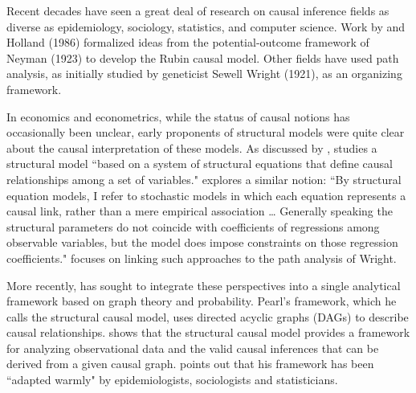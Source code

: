 \documentclass[11pt]{amsart}
\begin{document}

Recent decades have seen a great deal of research on causal inference fields as diverse as epidemiology, sociology, statistics, and computer science. 
Work by \cite{Rubin:1974im,Rubin:1977dv} and Holland (1986) formalized ideas from the potential-outcome framework of Neyman (1923) to develop the Rubin causal model. %
Other fields have used path analysis, as initially studied by geneticist Sewell Wright (1921), as an organizing framework.

In economics and econometrics, while the status of causal notions has occasionally been unclear, early proponents of structural models were quite clear about the causal interpretation of these models.
As discussed by \citep{Heckman:2015ez}, \citep{Haavelmo:1943cl,Haavelmo:1944jq} studies a structural model ``based on a system of structural equations that define causal relationships among a set of variables."
\citep[p.979]{Goldberger:1972cq} explores a similar notion: ``By structural equation models, I refer to stochastic models in which each equation represents a causal link, rather than a mere empirical association \dots
Generally speaking the structural parameters do not coincide with coefficients of regressions among observable variables, but the model does impose constraints on those regression coefficients."
\citep[p.979]{Goldberger:1972cq} focuses on linking such approaches to the path analysis of Wright.

More recently, \citet{Pearl:2009kh} has sought to integrate these perspectives into a single analytical framework based on graph theory and probability.
Pearl's framework, which he calls the structural causal model, uses directed acyclic graphs (DAGs) to describe causal relationships.
\citet{Pearl:2009kh} shows that the structural causal model provides a framework for analyzing observational data and the valid causal inferences that can be derived from a given causal graph.
\citet[p.698]{Pearl:2011jd} points out that his framework has been ``adapted warmly" by epidemiologists, sociologists and statisticians.
\end{document}
